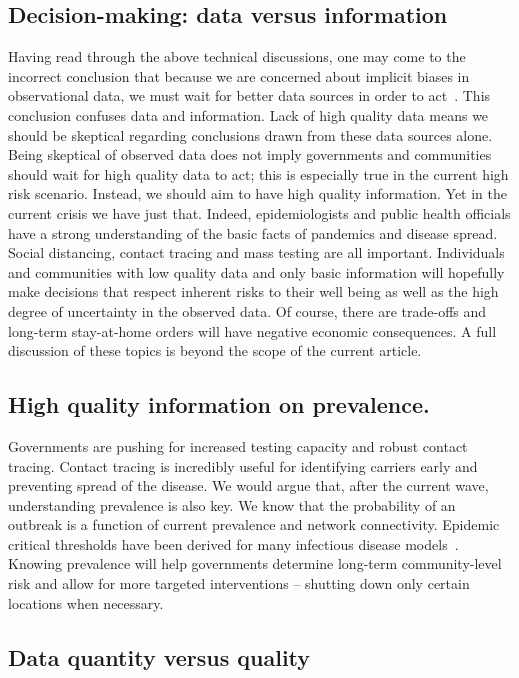 \documentclass[12pt]{article}
\begin{document}
\subsection*{Decision-making: data versus information}

Having read through the above technical discussions, one may come to the incorrect conclusion that because we are concerned about implicit biases in observational data, we must wait for better data sources in order to act~\cite{Ioannidis2020}.  This conclusion confuses data and information.  Lack of high quality data means we should be skeptical regarding conclusions drawn from these data sources alone.  Being skeptical of observed data does not imply governments and communities should wait for high quality data to act; this is especially true in the current high risk scenario.  Instead, we should aim to have high quality information.  Yet in the current crisis we have just that.  Indeed, epidemiologists and public health officials have a strong understanding of the basic facts of pandemics and disease spread.  Social distancing, contact tracing and mass testing are all important.  Individuals and communities with low quality data and only basic information will hopefully make decisions that respect inherent risks to their well being as well as the high degree of uncertainty in the observed data. Of course, there are trade-offs and long-term stay-at-home orders will have negative economic consequences.  A full discussion of these topics is beyond the scope of the current article.

\subsection*{High quality information on prevalence.}

Governments are pushing for increased testing capacity and robust contact tracing.  Contact tracing is incredibly useful for identifying carriers early and preventing spread of the disease.  We would argue that, after the current wave, understanding prevalence is also key.  We know that the probability of an outbreak is a function of current prevalence and network connectivity.  Epidemic critical thresholds have been derived for many infectious disease models~\cite{Pastor2001,Newman2002,Parshani2010}.  Knowing prevalence will help governments determine long-term community-level risk and allow for more targeted interventions -- shutting down only certain locations when necessary.

\subsection*{Data quantity versus quality}
\end{document}
